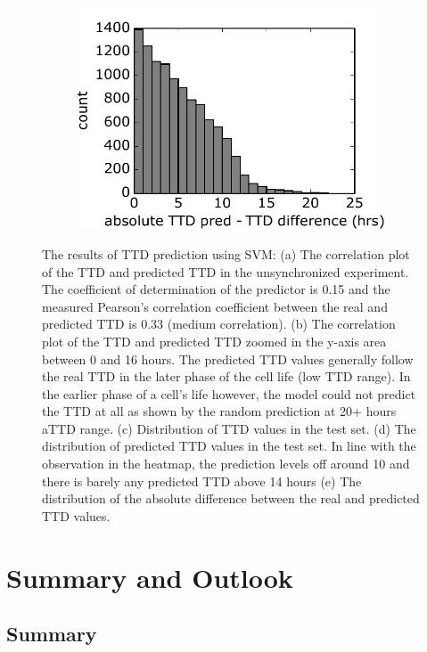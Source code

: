 \documentclass[pdftex,12pt,a4paper]{report}
\begin{document}
\begin{figure}[H]
\begin{subfigure}{.3\textwidth}
  \includegraphics[width=\textwidth]{images/svm/pred_ttd_absdiff.pdf}
  \caption{}
  \label{fig:pred_ttd_absdiff}
\end{subfigure}

\caption[SVM results]{The results of TTD prediction using SVM: (a) The correlation plot of the TTD and predicted TTD in the unsynchronized experiment. The coefficient of determination of the predictor is 0.15 and the measured Pearson's correlation coefficient between the real and predicted TTD is 0.33 (medium correlation). (b) The correlation plot of the TTD and predicted TTD zoomed in the y-axis area between 0 and 16 hours. The predicted TTD values generally follow the real TTD in the later phase of the cell life (low TTD range). In the earlier phase of a cell's life however, the model could not predict the TTD at all as shown by the random prediction at 20+ hours aTTD range. (c) Distribution of TTD values in the test set. (d) The distribution of predicted TTD values in the test set. In line with the observation in the heatmap, the prediction levels off around 10 and there is barely any predicted TTD above 14 hours (e) The distribution of the absolute difference between the real and predicted TTD values.}
\label{fig:svm_all}
\end{figure}

\chapter{Summary and Outlook}

\section{Summary}
\end{document}
